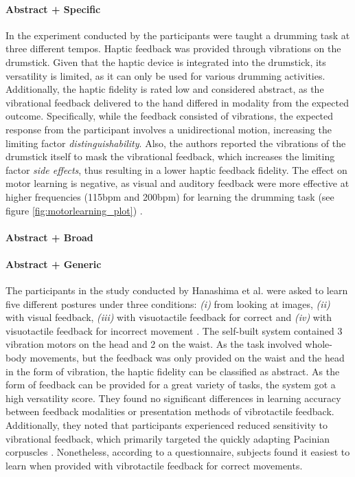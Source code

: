 \paragraph{Abstract + Specific} \label{sec:abstractspecific}
In the experiment conducted by \cite{Lee2012} the participants were taught a drumming task at three different tempos. Haptic feedback was provided through vibrations on the drumstick. Given that the haptic device is integrated into the drumstick, its versatility is limited, as it can only be used for various drumming activities. Additionally, the haptic fidelity is rated low and considered abstract, as the vibrational feedback delivered to the hand differed in modality from the expected outcome. Specifically, while the feedback consisted of vibrations, the expected response from the participant involves a unidirectional motion, increasing the limiting factor \textit{distinguishability}. Also, the authors reported the vibrations of the drumstick itself to mask the vibrational feedback, which increases the limiting factor \textit{side effects}, thus resulting in a lower haptic feedback fidelity. The effect on motor learning is negative, as visual and auditory feedback were more effective at higher frequencies (115bpm and 200bpm) for learning the drumming task (see figure \ref{fig:motorlearning_plot}) \cite{Lee2012}.

\paragraph{Abstract + Broad} \label{sec:abstractbroad}



\paragraph{Abstract + Generic} \label{sec:abstractgeneric}
The participants in the study conducted by Hanashima et al. were asked to learn five different postures under three conditions: \textit{(i)} from looking at images, \textit{(ii)} with visual feedback, \textit{(iii)} with visuotactile feedback for correct and \textit{(iv)} with visuotactile feedback for incorrect movement \cite{Hanashima2023}. The self-built system contained 3 vibration motors on the head and 2 on the waist. As the task involved whole-body movements, but the feedback was only provided on the waist and the head in the form of vibration, the haptic fidelity can be classified as abstract. As the form of feedback can be provided for a great variety of tasks, the system got a high versatility score. 
They found no significant differences in learning accuracy between feedback modalities or presentation methods of vibrotactile feedback. Additionally, they noted that participants experienced reduced sensitivity to vibrational feedback, which primarily targeted the quickly adapting Pacinian corpuscles \cite{Hanashima2023}. Nonetheless, according to a questionnaire, subjects found it easiest to learn when provided with vibrotactile feedback for correct movements.


